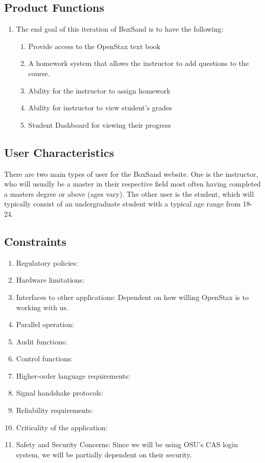 \documentclass[onecolumn, draftclsnofoot,10pt, compsoc]{IEEEtran}
\begin{document}
\subsection{Product Functions}

\begin{enumerate}
\item The end goal of this iteration of BoxSand is to have the following:
\begin{enumerate}
\item Provide access to the OpenStax text book
\item A homework system that allows the instructor to add questions to the course.
\item Ability for the instructor to assign homework
\item Ability for instructor to view student's grades 
\item Student Dashboard for viewing their progress
\end{enumerate}
\end{enumerate}

\subsection{User Characteristics}
There are two main types of user for the BoxSand website. One is the instructor, who will usually be a master in their respective field most often having completed a masters degree or above (ages vary). The other user is the student, which will typically consist of an undergraduate student with a typical age range from 18-24. 

\subsection{Constraints}

\begin{enumerate}
\item Regulatory policies:
\item Hardware limitations: 
\item Interfaces to other applications: Dependent on how willing OpenStax is to working with us.
\item Parallel operation:
\item Audit functions:
\item Control functions:
\item Higher-order language requirements:
\item Signal handshake protocols:
\item Reliability requirements:
\item Criticality of the application:
\item Safety and Security Concerns: Since we will be using OSU's CAS login system, we will be partially dependent on their security. 
\end{enumerate}
\end{document}
